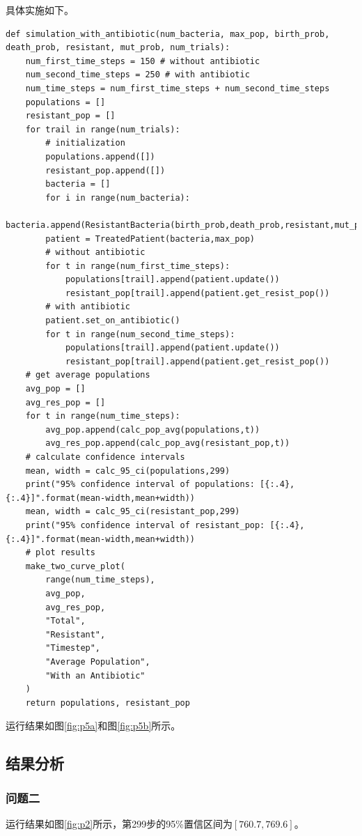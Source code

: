 \documentclass[logo,reportComp]{thesis}
\begin{document}
具体实施如下。
\begin{lstlisting}
def simulation_with_antibiotic(num_bacteria, max_pop, birth_prob, death_prob, resistant, mut_prob, num_trials):
    num_first_time_steps = 150 # without antibiotic
    num_second_time_steps = 250 # with antibiotic
    num_time_steps = num_first_time_steps + num_second_time_steps
    populations = []
    resistant_pop = []
    for trail in range(num_trials):
        # initialization
        populations.append([])
        resistant_pop.append([])
        bacteria = []
        for i in range(num_bacteria):
            bacteria.append(ResistantBacteria(birth_prob,death_prob,resistant,mut_prob))
        patient = TreatedPatient(bacteria,max_pop)
        # without antibiotic
        for t in range(num_first_time_steps):
            populations[trail].append(patient.update())
            resistant_pop[trail].append(patient.get_resist_pop())
        # with antibiotic
        patient.set_on_antibiotic()
        for t in range(num_second_time_steps):
            populations[trail].append(patient.update())
            resistant_pop[trail].append(patient.get_resist_pop())
    # get average populations
    avg_pop = []
    avg_res_pop = []
    for t in range(num_time_steps):
        avg_pop.append(calc_pop_avg(populations,t))
        avg_res_pop.append(calc_pop_avg(resistant_pop,t))
    # calculate confidence intervals
    mean, width = calc_95_ci(populations,299)
    print("95% confidence interval of populations: [{:.4},{:.4}]".format(mean-width,mean+width))
    mean, width = calc_95_ci(resistant_pop,299)
    print("95% confidence interval of resistant_pop: [{:.4},{:.4}]".format(mean-width,mean+width))
    # plot results
    make_two_curve_plot(
        range(num_time_steps),
        avg_pop,
        avg_res_pop,
        "Total",
        "Resistant",
        "Timestep",
        "Average Population",
        "With an Antibiotic"
    )
    return populations, resistant_pop
\end{lstlisting}

运行结果如图\ref{fig:p5a}和图\ref{fig:p5b}所示。

\subsection{结果分析}
\subsubsection{问题二}
\label{sub:results}
\label{sub:results}
运行结果如图\ref{fig:p2}所示，第299步的95\%置信区间为$[760.7,769.6]$。
\end{document}
